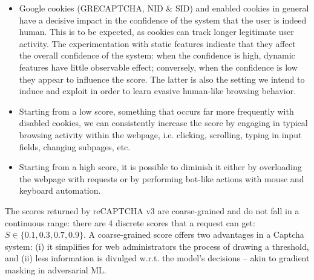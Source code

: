 \begin{itemize}
  \item Google cookies (GRECAPTCHA, NID \& SID) and enabled cookies in general have a decisive impact in the confidence of the system that the user is indeed human. This is to be expected, as cookies can track longer legitimate user activity.
  The experimentation with static features indicate that they affect the overall confidence of the system: when the confidence is high, dynamic features have little observable effect; conversely, when the confidence is low they appear to influence the score.
  The latter is also the setting we intend to induce and exploit in order to learn evasive human-like browsing behavior.
  \item Starting from a low score, something that occurs far more frequently with disabled cookies, we can consistently increase the score by engaging in typical browsing activity within the webpage, i.e. clicking, scrolling, typing in input fields, changing subpages, etc.
  \item Starting from a high score, it is possible to diminish it either by overloading the webpage with requests or by performing bot-like actions with mouse and keyboard automation.
\end{itemize}

The scores returned by reCAPTCHA v3 are coarse-grained and do not fall in a continuous range: there are 4 discrete scores that a request can get: $S \in \{0.1, 0.3, 0.7, 0.9\}$.
A coarse-grained score offers two advantages in a Captcha system: (i) it simplifies for web administrators the process of drawing a threshold, and (ii) less information is divulged w.r.t. the model's decisions -- akin to gradient masking in adversarial \gls{ML}.

